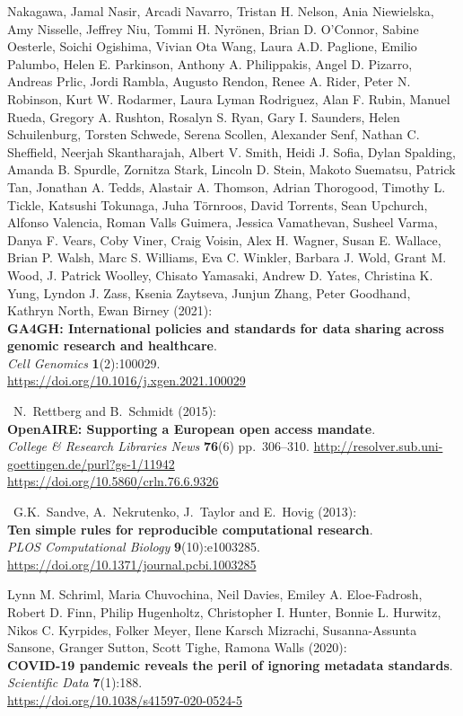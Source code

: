 \begin{thebibliography}{9}
Nakagawa, Jamal Nasir, Arcadi Navarro, Tristan H. Nelson, Ania
Niewielska, Amy Nisselle, Jeffrey Niu, Tommi H. Nyrönen, Brian D.
O'Connor, Sabine Oesterle, Soichi Ogishima, Vivian Ota Wang, Laura A.D.
Paglione, Emilio Palumbo, Helen E. Parkinson, Anthony A. Philippakis,
Angel D. Pizarro, Andreas Prlic, Jordi Rambla, Augusto Rendon, Renee A.
Rider, Peter N. Robinson, Kurt W. Rodarmer, Laura Lyman Rodriguez, Alan
F. Rubin, Manuel Rueda, Gregory A. Rushton, Rosalyn S. Ryan, Gary I.
Saunders, Helen Schuilenburg, Torsten Schwede, Serena Scollen, Alexander
Senf, Nathan C. Sheffield, Neerjah Skantharajah, Albert V. Smith, Heidi
J. Sofia, Dylan Spalding, Amanda B. Spurdle, Zornitza Stark, Lincoln D.
Stein, Makoto Suematsu, Patrick Tan, Jonathan A. Tedds, Alastair A.
Thomson, Adrian Thorogood, Timothy L. Tickle, Katsushi Tokunaga, Juha
Törnroos, David Torrents, Sean Upchurch, Alfonso Valencia, Roman Valls
Guimera, Jessica Vamathevan, Susheel Varma, Danya F. Vears, Coby Viner,
Craig Voisin, Alex H. Wagner, Susan E. Wallace, Brian P. Walsh, Marc S.
Williams, Eva C. Winkler, Barbara J. Wold, Grant M. Wood, J. Patrick
Woolley, Chisato Yamasaki, Andrew D. Yates, Christina K. Yung, Lyndon J.
Zass, Ksenia Zaytseva, Junjun Zhang, Peter Goodhand, Kathryn North, Ewan
Birney (2021):\\
\textbf{GA4GH: International policies and standards for data sharing
across genomic research and healthcare}.\\
\emph{Cell Genomics} \textbf{1}(2):100029.\\
\url{https://doi.org/10.1016/j.xgen.2021.100029}

~N.~Rettberg and B.~Schmidt (2015):\\
\textbf{OpenAIRE: Supporting a European open access mandate}.\\
\emph{College \& Research Libraries News} \textbf{76}(6) pp.~306--310.
\url{http://resolver.sub.uni-goettingen.de/purl?gs-1/11942}\\
\url{https://doi.org/10.5860/crln.76.6.9326}

~G.K.~Sandve, A.~Nekrutenko, J.~Taylor and E.~Hovig (2013):\\
\textbf{Ten simple rules for reproducible computational research}.\\
\emph{PLOS Computational Biology} \textbf{9}(10):e1003285.\\
\url{https://doi.org/10.1371/journal.pcbi.1003285}

 Lynn M. Schriml, Maria Chuvochina, Neil Davies, Emiley A.
Eloe-Fadrosh, Robert D. Finn, Philip Hugenholtz, Christopher I. Hunter,
Bonnie L. Hurwitz, Nikos C. Kyrpides, Folker Meyer, Ilene Karsch
Mizrachi, Susanna-Assunta Sansone, Granger Sutton, Scott Tighe, Ramona
Walls (2020):\\
\textbf{COVID-19 pandemic reveals the peril of ignoring metadata
standards}.\\
\emph{Scientific Data} \textbf{7}(1):188.\\
\url{https://doi.org/10.1038/s41597-020-0524-5}


\end{thebibliography}
